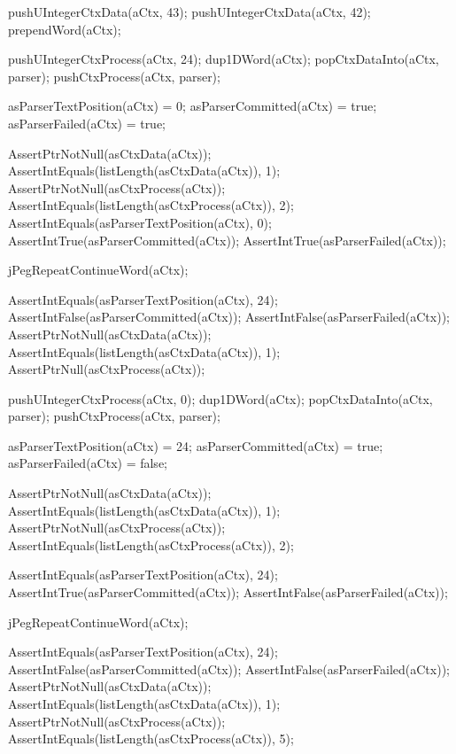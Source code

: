   pushUIntegerCtxData(aCtx, 43);
  pushUIntegerCtxData(aCtx, 42);
  prependWord(aCtx);
\stopCTest


\startCTest
  pushUIntegerCtxProcess(aCtx, 24);
  dup1DWord(aCtx);
  popCtxDataInto(aCtx, parser);
  pushCtxProcess(aCtx, parser);
  
  asParserTextPosition(aCtx) = 0;
  asParserCommitted(aCtx)    = true;
  asParserFailed(aCtx)       = true;
  
  AssertPtrNotNull(asCtxData(aCtx));
  AssertIntEquals(listLength(asCtxData(aCtx)), 1);
  AssertPtrNotNull(asCtxProcess(aCtx));
  AssertIntEquals(listLength(asCtxProcess(aCtx)), 2);
  AssertIntEquals(asParserTextPosition(aCtx), 0);
  AssertIntTrue(asParserCommitted(aCtx));
  AssertIntTrue(asParserFailed(aCtx));
  
  jPegRepeatContinueWord(aCtx);
  
  AssertIntEquals(asParserTextPosition(aCtx), 24);
  AssertIntFalse(asParserCommitted(aCtx));
  AssertIntFalse(asParserFailed(aCtx));
  AssertPtrNotNull(asCtxData(aCtx));
  AssertIntEquals(listLength(asCtxData(aCtx)), 1);
  AssertPtrNull(asCtxProcess(aCtx));
\stopCTest
\stopTestCase


\startCTest
  pushUIntegerCtxProcess(aCtx, 0);
  dup1DWord(aCtx);
  popCtxDataInto(aCtx, parser);
  pushCtxProcess(aCtx, parser);
  
  asParserTextPosition(aCtx) = 24;
  asParserCommitted(aCtx)    = true;
  asParserFailed(aCtx)       = false;
  
  AssertPtrNotNull(asCtxData(aCtx));
  AssertIntEquals(listLength(asCtxData(aCtx)), 1);
  AssertPtrNotNull(asCtxProcess(aCtx));
  AssertIntEquals(listLength(asCtxProcess(aCtx)), 2);
  
  AssertIntEquals(asParserTextPosition(aCtx), 24);
  AssertIntTrue(asParserCommitted(aCtx));
  AssertIntFalse(asParserFailed(aCtx));
  
  jPegRepeatContinueWord(aCtx);
  
  AssertIntEquals(asParserTextPosition(aCtx), 24);
  AssertIntFalse(asParserCommitted(aCtx));
  AssertIntFalse(asParserFailed(aCtx));
  AssertPtrNotNull(asCtxData(aCtx));
  AssertIntEquals(listLength(asCtxData(aCtx)), 1);
  AssertPtrNotNull(asCtxProcess(aCtx));
  AssertIntEquals(listLength(asCtxProcess(aCtx)), 5);
    
